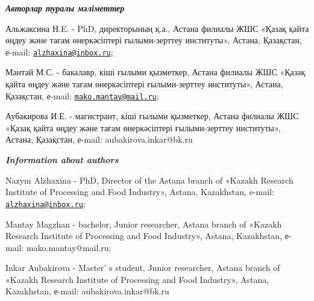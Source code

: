 \begin{authorinfo}
\emph{{\bfseries Авторлар туралы мәліметтер}}

Альжаксина Н.E. - PhD, директорының қ.а., Астана филиалы ЖШС «Қазақ
қайта өңдеу және тағам өнеркәсіптері ғылыми-зерттеу институты», Астана,
Қазақстан, е-mail:
\href{mailto:alzhaxina@inbox.ru}{\nolinkurl{alzhaxina@inbox.ru}};

Мантай М.С. - бакалавр, кіші ғылыми қызметкер, Астана филиалы ЖШС «Қазақ
қайта өңдеу және тағам өнеркәсіптері ғылыми-зерттеу институты», Астана,
Қазақстан, е-mail:
\href{mailto:mako.mantay@mail.ru}{\nolinkurl{mako.mantay@mail.ru}};

Аубакирова И.Е. - магистрант, кіші ғылыми қызметкер, Астана филиалы ЖШС
«Қазақ қайта өңдеу және тағам өнеркәсіптері ғылыми-зерттеу институты»,
Астана, Қазақстан, е-mail: aubakirova.inkar@bk.ru

\emph{{\bfseries Information about authors}}

Nazym Alzhaxina - PhD, Director of the Astana branch of «Kazakh Research
Institute of Processing and Food Industry», Astana, Kazakhstan, e-mail:
\href{mailto:alzhaxina@inbox.ru}{\nolinkurl{alzhaxina@inbox.ru}};

Mantay Magzhan - bachelor, Junior researcher, Astana branch of «Kazakh
Research Institute of Processing and Food Industry», Astana, Kazakhstan,
е-mail: mako.mantay@mail.ru;~

Inkar Aubakirova - Master' s student, Junior researcher,
Astana branch of «Kazakh Research Institute of Processing and Food
Industry», Astana, Kazakhstan, е-mail: aubakirova.inkar@bk.ru
\end{authorinfo}
